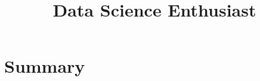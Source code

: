 \documentclass[11pt,a4paper,sans]{moderncv}        %
\title{Data Science Enthusiast}                                %
\newcommand{\comment}[1]{}
\begin{document}

\makecvtitle

\vspace*{-1.2cm} %


\section{Summary}

\comment{
\cvitem{title}{\emph{Title}}
\cvitem{supervisors}{Supervisors}
\cvitem{description}{Short thesis abstract}
}

\comment{
\cventry{year--year}{Job title}{Employer}{City}{}{General description no longer than 1--2 lines.\newline{}%
Detailed achievements:%
\begin{itemize}%
\item Achievement 1;
\item Achievement 2, with sub-achievements:
  \begin{itemize}%
  \item Sub-achievement (a);
  \item Sub-achievement (b), with sub-sub-achievements (don't do this!);
    \begin{itemize}
    \item Sub-sub-achievement i;
    \item Sub-sub-achievement ii;
    \item Sub-sub-achievement iii;
    \end{itemize}
  \item Sub-achievement (c);
  \end{itemize}
\item Achievement 3.
\end{itemize}}
}
\end{document}
